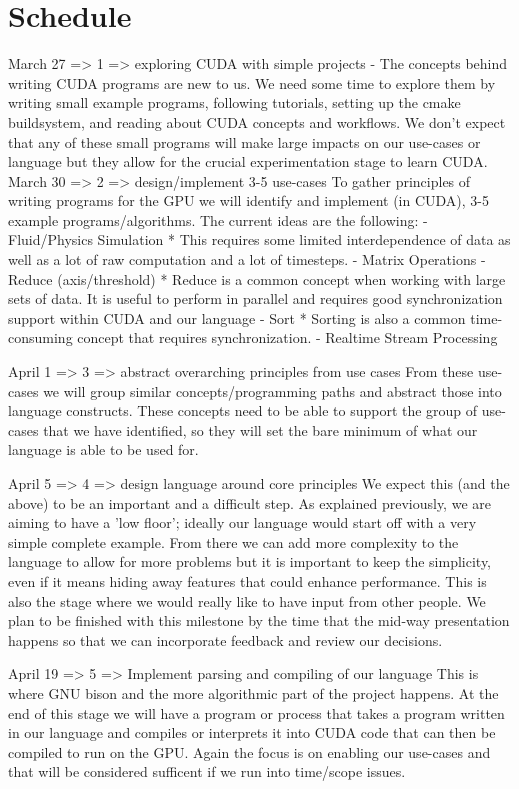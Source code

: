\documentclass{article}
\begin{document}
\section{Schedule}
March 27 => 1 => exploring CUDA with simple projects
  - The concepts behind writing CUDA programs are new to us. We need some time to explore them by writing small example programs, following tutorials, setting up the cmake buildsystem, and reading about CUDA concepts and workflows. We don't expect that any of these small programs will make large impacts on our use-cases or language but they allow for the crucial experimentation stage to learn CUDA.
March 30 => 2 => design/implement 3-5 use-cases
  To gather principles of writing programs for the GPU we will identify and implement (in CUDA), 3-5 example programs/algorithms. The current ideas are the following:
  - Fluid/Physics Simulation
    * This requires some limited interdependence of data as well as a lot of raw computation and a lot of timesteps.
  - Matrix Operations
  - Reduce (axis/threshold)
    * Reduce is a common concept when working with large sets of data. It is useful to perform in parallel and requires good synchronization support within CUDA and our language
  - Sort
    * Sorting is also a common time-consuming concept that requires synchronization.
  - Realtime Stream Processing

April 1  => 3 => abstract overarching principles from use cases
  From these use-cases we will group similar concepts/programming paths and abstract those into language constructs. These concepts need to be able to support the group of use-cases that we have identified, so they will set the bare minimum of what our language is able to be used for.

April 5  => 4 => design language around core principles
  We expect this (and the above) to be an important and a difficult step. As explained previously, we are aiming to have a 'low floor'; ideally our language would start off with a very simple complete example. From there we can add more complexity to the language to allow for more problems but it is important to keep the simplicity, even if it means hiding away features that could enhance performance. This is also the stage where we would really like to have input from other people. We plan to be finished with this milestone by the time that the mid-way presentation happens so that we can incorporate feedback and review our decisions.
  
April 19 => 5 => Implement parsing and compiling of our language
  This is where GNU bison and the more algorithmic part of the project happens. At the end of this stage we will have a program or process that takes a program written in our language and compiles or interprets it into CUDA code that can then be compiled to run on the GPU. Again the focus is on enabling our use-cases and that will be considered sufficent if we run into time/scope issues.
\end{document}
